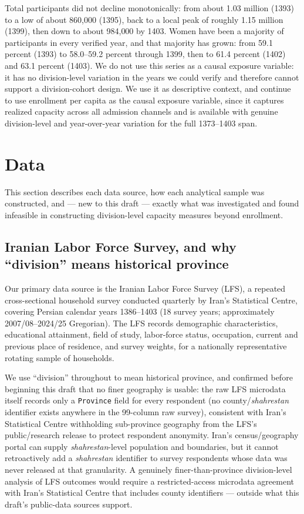 \documentclass[11pt]{article}
\begin{document}
Total participants did not decline monotonically: from about 1.03 million (1393) to a low of about 860{,}000 (1395), back to a local peak of roughly 1.15 million (1399), then down to about 984{,}000 by 1403. Women have been a majority of participants in every verified year, and that majority has grown: from 59.1 percent (1393) to 58.0--59.2 percent through 1399, then to 61.4 percent (1402) and 63.1 percent (1403). We do not use this series as a causal exposure variable: it has no division-level variation in the years we could verify and therefore cannot support a division-cohort design. We use it as descriptive context, and continue to use enrollment per capita as the causal exposure variable, since it captures realized capacity across all admission channels and is available with genuine division-level and year-over-year variation for the full 1373--1403 span.

\section{Data}

This section describes each data source, how each analytical sample was constructed, and --- new to this draft --- exactly what was investigated and found infeasible in constructing division-level capacity measures beyond enrollment.

\subsection{Iranian Labor Force Survey, and why ``division'' means historical province}

Our primary data source is the Iranian Labor Force Survey (LFS), a repeated cross-sectional household survey conducted quarterly by Iran's Statistical Centre, covering Persian calendar years 1386--1403 (18 survey years; approximately 2007/08--2024/25 Gregorian). The LFS records demographic characteristics, educational attainment, field of study, labor-force status, occupation, current and previous place of residence, and survey weights, for a nationally representative rotating sample of households.

We use ``division'' throughout to mean historical province, and confirmed before beginning this draft that no finer geography is usable: the raw LFS microdata itself records only a \texttt{Province} field for every respondent (no county/\emph{shahrestan} identifier exists anywhere in the 99-column raw survey), consistent with Iran's Statistical Centre withholding sub-province geography from the LFS's public/research release to protect respondent anonymity. Iran's census/geography portal can supply \emph{shahrestan}-level population and boundaries, but it cannot retroactively add a \emph{shahrestan} identifier to survey respondents whose data was never released at that granularity. A genuinely finer-than-province division-level analysis of LFS outcomes would require a restricted-access microdata agreement with Iran's Statistical Centre that includes county identifiers --- outside what this draft's public-data sources support.
\end{document}
